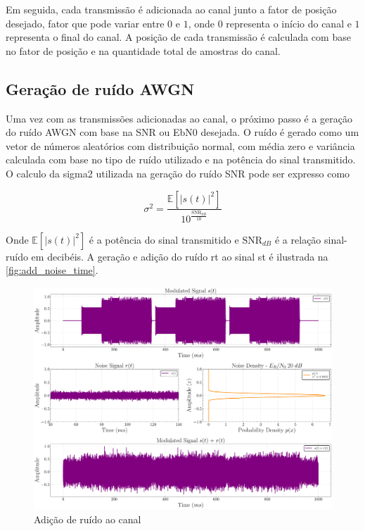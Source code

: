 Em seguida, cada transmissão é adicionada ao canal junto a fator de posição desejado, fator que pode variar entre $0$ e $1$, onde $0$ representa o início do canal e $1$ representa o final do canal. A posição de cada transmissão é calculada com base no fator de posição e na quantidade total de amostras do canal. 

\subsection{Geração de ruído AWGN}\label{sec:geracao_ruido}

Uma vez com as transmissões adicionadas ao canal, o próximo passo é a geração do ruído \gls{AWGN} com base na \gls{SNR} ou \gls{EbN0} desejada. O ruído é gerado como um vetor de números aleatórios com distribuição normal, com média zero e variância calculada com base no tipo de ruído utilizado e na potência do sinal transmitido. O calculo da \gls{sigma2} utilizada na geração do ruído \gls{SNR} pode ser expresso como

\begin{equation}
    \sigma^2 = \frac{\mathbb{E}\!\left[ |s(t)|^2 \right]}{10^{\frac{\mathrm{SNR}_{dB}}{10}}}
\end{equation}

\noindent Onde $\mathbb{E}\!\left[ |s(t)|^2 \right]$ é a potência do sinal transmitido e $\mathrm{SNR}_{dB}$ é a relação sinal-ruído em decibéis. A geração e adição do ruído \gls{rt} ao sinal \gls{st} é ilustrada na \autoref{fig:add_noise_time}.

\begin{figure}[H]
	\centering
	\caption{Adição de ruído ao canal}\label{fig:add_noise_time}
	\includegraphics[width=\linewidth]{assets/cap3/example_channel_time_channel.pdf}
\end{figure}

